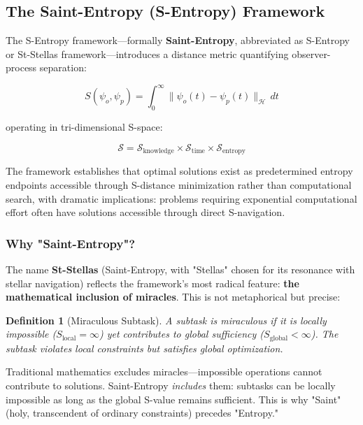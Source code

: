 \documentclass[12pt,a4paper]{article}
\newtheorem{definition}[theorem]{Definition}
\begin{document}
\subsection{The Saint-Entropy (S-Entropy) Framework}

The S-Entropy framework—formally \textbf{Saint-Entropy}, abbreviated as S-Entropy or St-Stellas framework—introduces a distance metric quantifying observer-process separation:

\begin{equation}
S(\psi_o, \psi_p) = \int_0^{\infty} \|\psi_o(t) - \psi_p(t)\|_{\mathcal{H}} \, dt
\end{equation}

operating in tri-dimensional S-space:

\begin{equation}
\mathcal{S} = \mathcal{S}_{\text{knowledge}} \times \mathcal{S}_{\text{time}} \times \mathcal{S}_{\text{entropy}}
\end{equation}

The framework establishes that optimal solutions exist as predetermined entropy endpoints accessible through S-distance minimization rather than computational search, with dramatic implications: problems requiring exponential computational effort often have solutions accessible through direct S-navigation.

\subsubsection{Why "Saint-Entropy"?}

The name \textbf{St-Stellas} (Saint-Entropy, with "Stellas" chosen for its resonance with stellar navigation) reflects the framework's most radical feature: \textbf{the mathematical inclusion of miracles}. This is not metaphorical but precise:

\begin{definition}[Miraculous Subtask]
A subtask is \textit{miraculous} if it is locally impossible ($S_{\text{local}} = \infty$) yet contributes to global sufficiency ($S_{\text{global}} < \infty$). The subtask violates local constraints but satisfies global optimization.
\end{definition}

Traditional mathematics excludes miracles—impossible operations cannot contribute to solutions. Saint-Entropy \textit{includes} them: subtasks can be locally impossible as long as the global S-value remains sufficient. This is why "Saint" (holy, transcendent of ordinary constraints) precedes "Entropy."
\end{document}

